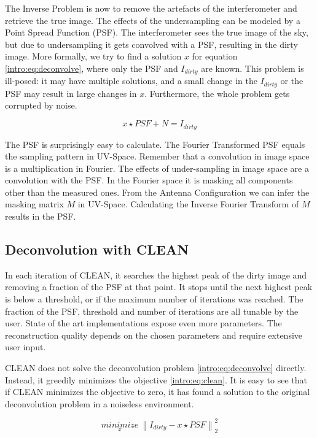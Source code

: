 The Inverse Problem is now to remove the artefacts of the interferometer and retrieve the true image. The effects of the undersampling can be modeled by a Point Spread Function (PSF). The interferometer sees the true image of the sky, but due to undersampling it gets convolved with a PSF, resulting in the dirty image.  More formally, we try to find a solution $x$ for equation \eqref{intro:eq:deconvolve}, where only the PSF and $I_{dirty}$ are known. This problem is ill-posed: it may have multiple solutions, and a small change in the $I_{dirty}$ or the PSF may result in large changes in $x$. Furthermore, the whole problem gets corrupted by noise.

\begin{equation}\label{intro:eq:deconvolve}
x \star  PSF + N = I_{dirty} 
\end{equation}

The PSF is surprisingly easy to calculate. The Fourier Transformed PSF equals the sampling pattern in UV-Space. Remember that a convolution in image space is a multiplication in Fourier. The effects of under-sampling in image space are a convolution with the PSF. In the Fourier space it is masking all components other than the measured ones. From the Antenna Configuration we can infer the masking matrix $M$ in UV-Space. Calculating the Inverse Fourier Transform of $M$ results in the PSF.


\subsection{Deconvolution with CLEAN}
In each iteration of CLEAN, it searches the highest peak of the dirty image and removing a fraction of the PSF at that point. It stops until the next highest peak is below a threshold, or if the maximum number of iterations was reached. The fraction of the PSF, threshold and number of iterations are all tunable by the user. State of the art implementations expose even more parameters. The reconstruction quality depends on the chosen parameters and require extensive user input.

CLEAN does not solve the deconvolution problem \eqref{intro:eq:deconvolve} directly. Instead, it greedily minimizes the objective \eqref{intro:eq:clean}. It is easy to see that if CLEAN minimizes the objective to zero, it has found a solution to the original deconvolution problem in a noiseless environment.

\begin{equation}\label{intro:eq:clean}
\underset{x}{minimize} \: \left \| I_{dirty} - x \star PSF \right \|_2^2
\end{equation}

